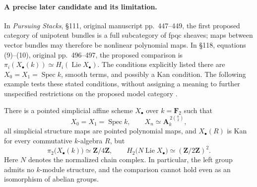 \paragraph{A precise later candidate and its limitation.}
In \emph{Pursuing Stacks}, \S111, original manuscript
pp.~447--449, the first proposed category of unipotent bundles is a full
subcategory of fpqc sheaves; maps between vector bundles may therefore be
nonlinear polynomial maps.  In \S118, equations (9)--(10), original
pp.~496--497, the proposed comparison is
\(\pi_i(X_\bullet(k))\simeq H_i(\operatorname{Lie}X_\bullet)\).
The conditions explicitly listed there are \(X_0=X_1=\operatorname{Spec}k\),
smooth terms, and possibly a Kan condition.
The following example tests these stated conditions, without assigning a
meaning to further unspecified restrictions on the proposed model category
\cite{A567_GrothendieckPursuing1983}.

\begin{proposition}\label{B:Lie-comparison-counterexample}
There is a pointed simplicial affine scheme \(X_\bullet\) over
\(k=\mathbf F_2\) such that
\[
 X_0=X_1=\operatorname{Spec}k,
 \qquad X_n\simeq\mathbf A_k^{\,2\binom n2},
\]
all simplicial structure maps are pointed polynomial maps, and
\(X_\bullet(R)\) is Kan for every commutative \(k\)-algebra \(R\), but
\[
 \pi_2\bigl(X_\bullet(k)\bigr)\simeq\mathbf Z/4\mathbf Z,
 \qquad
 H_2\bigl(N\operatorname{Lie}X_\bullet\bigr)
       \simeq(\mathbf Z/2\mathbf Z)^2.
\]
Here \(N\) denotes the normalized chain complex.  In particular, the left
group admits no \(k\)-module structure, and the comparison cannot hold
even as an isomorphism of abelian groups.
\end{proposition}

